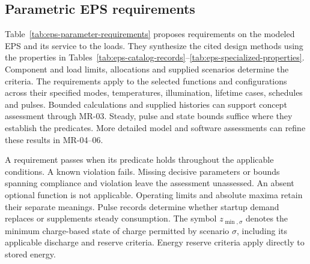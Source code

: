 \subsection{Parametric EPS requirements}
\label{subsection:eps-parametric-requirements}

Table~\ref{tab:eps-parameter-requirements} proposes requirements on the modeled EPS and its service to the loads. They synthesize the cited design methods using the properties in Tables~\ref{tab:eps-catalog-records}--\ref{tab:eps-specialized-properties}. Component and load limits, allocations and supplied scenarios determine the criteria. The requirements apply to the selected functions and configurations across their specified modes, temperatures, illumination, lifetime cases, schedules and pulses. Bounded calculations and supplied histories can support concept assessment through MR-03. Steady, pulse and state bounds suffice where they establish the predicates. More detailed model and software assessments can refine these results in MR-04--06.

A requirement passes when its predicate holds throughout the applicable conditions. A known violation fails. Missing decisive parameters or bounds spanning compliance and violation leave the assessment unassessed. An absent optional function is not applicable. Operating limits and absolute maxima retain their separate meanings. Pulse records determine whether startup demand replaces or supplements steady consumption. The symbol \(z_{\min,\sigma}\) denotes the minimum charge-based state of charge permitted by scenario \(\sigma\), including its applicable discharge and reserve criteria. Energy reserve criteria apply directly to stored energy.

